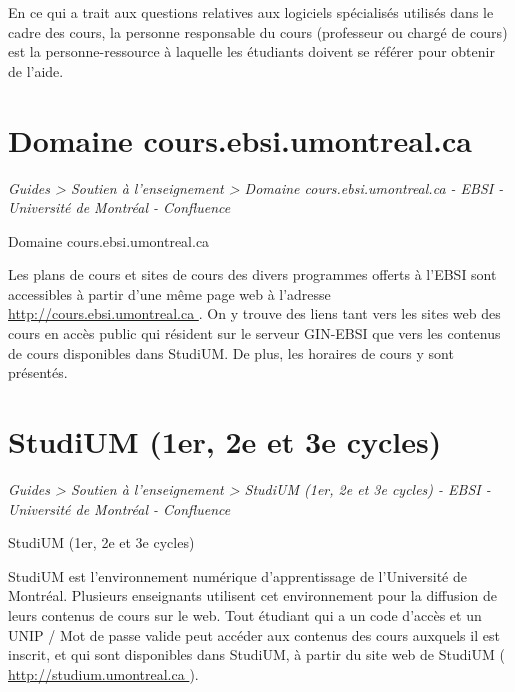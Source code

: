 \documentclass [12 pt]{article}
\begin{document}
            En ce qui a trait aux questions relatives aux logiciels spécialisés utilisés dans le
                cadre des cours, la personne responsable du cours (professeur ou chargé de cours)
                est la personne-ressource à laquelle les étudiants doivent se référer pour obtenir
                de l'aide.
        
    
    
        \newpage
        \section {
        Domaine cours.ebsi.umontreal.ca
        }
        
        
        
        \textit{
        Guides > Soutien à l'enseignement > Domaine cours.ebsi.umontreal.ca - EBSI
            - Université de Montréal - Confluence
        }
    
        Domaine cours.ebsi.umontreal.ca
        
            Les plans de cours et sites de cours des divers programmes offerts à l'EBSI sont
                accessibles à partir d'une même page web à l'adresse 
        \href{
        http://cours.ebsi.umontreal.ca
        } {
        http://cours.ebsi.umontreal.ca
        }
    . On y
                trouve des liens tant vers les sites web des cours en accès public qui résident sur
                le serveur GIN-EBSI que vers les contenus de cours disponibles dans StudiUM. De
                plus, les horaires de cours y sont présentés.
        
    
    
        \newpage
        \section {
        StudiUM (1er, 2e et 3e cycles)
        }
        
        
        
        \textit{
        Guides > Soutien à l'enseignement > StudiUM (1er, 2e et 3e cycles) - EBSI
            - Université de Montréal - Confluence
        }
    
        StudiUM (1er, 2e et 3e cycles)
        
            StudiUM est l'environnement numérique d'apprentissage de l'Université de Montréal.
                Plusieurs enseignants utilisent cet environnement pour la diffusion de leurs
                contenus de cours sur le web. Tout étudiant qui a un code d'accès et un UNIP / Mot
                de passe valide peut accéder aux contenus des cours auxquels il est inscrit, et qui
                sont disponibles dans StudiUM, à partir du site web de StudiUM (
        \href{
        http://studium.umontreal.ca
        } {
        http://studium.umontreal.ca
        }
    ).
        
\end{document}
